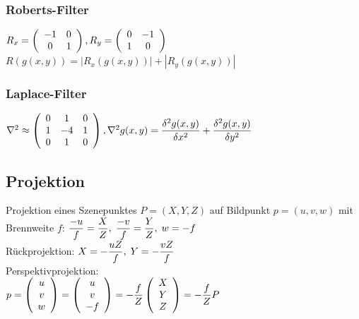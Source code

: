 \documentclass[8pt,a4paper,landscape]{scrartcl}
\begin{document}
\begin{multicols*}{3}
\subsubsection*{Roberts-Filter}
$ R_x=\left(\begin{Array}{cc}
	-1 & 0\\
	0 & 1
\end{Array}\right), R_y=\left(\begin{Array}{cc}
0 & -1\\
1 & 0
\end{Array}\right)$\\
$R(g(x,y)) = |R_x(g(x,y))|+|R_y(g(x,y))| $
\subsubsection*{Laplace-Filter}
$ \nabla^2 \approx \left(\begin{Array}{ccc}
	0 & 1 & 0\\
	1 & -4 & 1\\
	0 & 1 & 0\\
\end{Array}\right), \nabla^2g(x,y) = \dfrac{\delta^2g(x,y)}{\delta x^2} + \dfrac{\delta^2g(x,y)}{\delta y^2}$
\subsection*{Projektion}
Projektion eines Szenepunktes $ P=(X,Y,Z) $ auf Bildpunkt $ p=(u,v,w) $ mit Brennweite $ f $:
$
\dfrac{-u}{f} = \dfrac{X}{Z}, \hspace{.1cm} \dfrac{-v}{f} = \dfrac{Y}{Z}, \hspace{.1cm} w = -f 
$\\
Rückprojektion: $ X = -\dfrac{uZ}{f}, \hspace{.1cm} Y=-\dfrac{vZ}{f}$\\
Perspektivprojektion: \\
$ p= \left(\begin{Array}{c}
	u \\ v \\ w
\end{Array}\right) = \left(\begin{Array}{c}
u \\ v \\ -f
\end{Array}\right) = -\dfrac{f}{Z}\left(\begin{Array}{c}
X \\ Y \\ Z
\end{Array}\right) = -\dfrac{f}{Z}P$


\end{multicols*}
\end{document}
